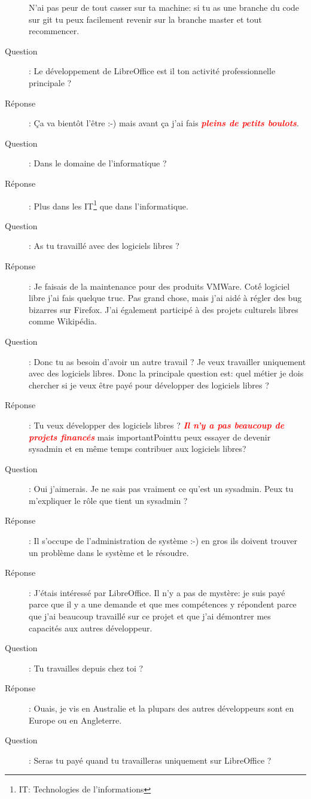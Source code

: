 \documentclass[a4paper,12pt, draft]{report}
\newcommand{\badPoint}[1]{\textcolor{red}{\textbf{\textit{#1}}}}
\begin{document}
\begin{description}
N'ai pas peur de tout casser sur ta machine: si tu as une branche du code sur git tu peux facilement revenir sur la branche master et tout recommencer.
\item [Question]:  Le développement de LibreOffice est il ton activité professionnelle principale ?
\item [Réponse]:  Ça va bientôt l'être :-) mais avant ça j'ai fais \badPoint{pleins de petits boulots}.
\item [Question]:  Dans le domaine de l'informatique ?
\item [Réponse]:  Plus dans les IT\footnote{\textsc{IT}: Technologies de l'informations} que dans l'informatique.
\item [Question]:  As tu travaillé avec des logiciels libres ?
\item [Réponse]:  Je faisais de la maintenance pour des produits VMWare. Cotế logiciel libre j'ai fais quelque truc. Pas grand chose, mais j'ai aidé à régler des bug bizarres sur Firefox. J'ai également participé à des projets culturels libres comme Wikipédia.
\item [Question]:  Donc tu as besoin d'avoir un autre travail ? Je veux travailler uniquement avec des logiciels libres. Donc la principale question est: quel métier je dois chercher si je veux être payé pour développer des logiciels libres ?
\item [Réponse]:  Tu veux développer des logiciels libres ? \badPoint{Il n'y a pas beaucoup de projets financés} mais importantPoint{tu peux essayer de devenir sysadmin} et en même temps contribuer aux logiciels libres?
\item [Question]:  Oui j'aimerais. Je ne sais pas vraiment ce qu'est un sysadmin. Peux tu m'expliquer le rôle que tient un sysadmin ?
\item [Réponse]:  Il s'occupe de l'administration de système :-) en gros ils doivent trouver un problème dans le système et le résoudre.
\item [Réponse]:  J'étais intéressé par LibreOffice. Il n'y a pas de mystère: je suis payé parce que il y a une demande et que mes compétences y répondent parce que j'ai beaucoup travaillé sur ce projet et que j'ai démontrer mes capacités aux autres développeur.
\item [Question]:  Tu travailles depuis chez toi ?
\item [Réponse]:  Ouais, je vis en Australie et la plupars des autres développeurs sont en Europe ou en Angleterre.
\item [Question]:  Seras tu payé quand tu travailleras uniquement sur LibreOffice ?

\end{description}
\end{document}
